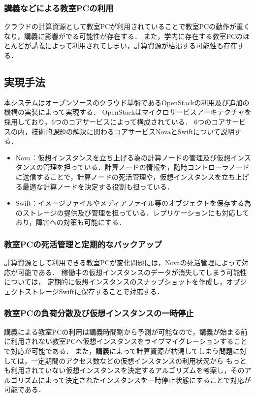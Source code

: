 \documentclass[11pt,a4paper]{jsarticle}
\begin{document}
\subsubsection{講義などによる教室PCの利用}
クラウドの計算資源として教室PCが利用されていることで教室PCの動作が重くなり，講義に影響がでる可能性が存在する．
また，学内に存在する教室PCのほとんどが講義によって利用されてしまい，計算資源が枯渇する可能性も存在する．
\subsection{実現手法}
本システムはオープンソースのクラウド基盤であるOpenStackの利用及び追加の機構の実装によって実現する．
OpenStackはマイクロサービスアーキテクチャを採用しており，6つのコアサービスによって構成されている．
6つのコアサービスの内，技術的課題の解決に関わるコアサービスNovaとSwiftについて説明する．
\begin{itemize}
	\item Nova：仮想インスタンスを立ち上げる為の計算ノードの管理及び仮想インスタンスの管理を担っている．計算ノードの情報を，随時コントローラノードに送信することで，計算ノードの死活管理や，仮想インスタンスを立ち上げる最適な計算ノードを決定する役割も担っている．
	\item Swift：イメージファイルやメディアファイル等のオブジェクトを保存する為のストレージの提供及び管理を担っている．レプリケーションにも対応しており，障害への対策も可能にする．
\end{itemize}
\subsubsection{教室PCの死活管理と定期的なバックアップ}
計算資源として利用できる教室PCが変化問題には，Novaの死活管理によって対応が可能である．
稼働中の仮想インスタンスのデータが消失してしまう可能性については，
定期的に仮想インスタンスのスナップショットを作成し，オブジェクトストレージSwiftに保存することで対応する．
\subsubsection{教室PCの負荷分散及び仮想インスタンスの一時停止}
講義による教室PCの利用は講義時間割から予測が可能なので，講義が始まる前に利用されない教室PCへ仮想インスタンスをライブマイグレーションすることで対応が可能である．
また，講義によって計算資源が枯渇してしまう問題に対しては，一定期間のアクセス数などの仮想インスタンスの利用状況から
もっとも利用されていない仮想インスタンスを決定するアルゴリズムを考案し，そのアルゴリズムによって決定されたインスタンスを一時停止状態にすることで対応が可能である．
\end{document}
